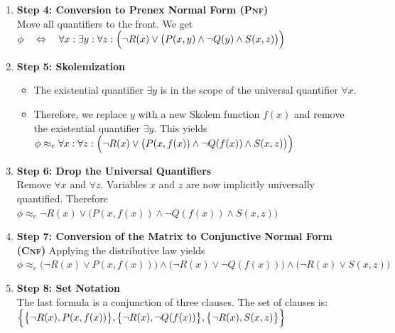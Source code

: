 \begin{enumerate}
\item \textbf{Step 4: Conversion to Prenex Normal Form (\textsc{Pnf})} \\
      Move all quantifiers to the front. We get
      \\[0.2cm]
      \hspace*{1.3cm}
      $\phi \quad\Leftrightarrow\quad
       \forall x: \exists y: \forall z: \Bigl(\neg R(x) \lor \bigl(P(x,y) \land \neg Q(y) \land S(x,z)\bigr)\Bigr)$
    \item \textbf{Step 5: Skolemization}
    \begin{itemize}
        \item The existential quantifier $\exists y$ is in the scope of the universal quantifier $\forall x$.
        \item Therefore, we replace $y$ with a new Skolem function $f(x)$ and remove the existential quantifier
          $\exists y$.   This yields
          \\[0.2cm]
          \hspace*{1.3cm}
          $\phi \approx_e \forall x: \forall z: \Bigl(\neg R(x) \lor \bigl(P(x,f(x)) \land \neg Q(f(x)) \land S(x,z)\bigr)\Bigr)$
       \end{itemize}
  \item \textbf{Step 6: Drop the Universal Quantifiers} \\
    Remove $\forall x$ and $\forall z$. Variables $x$ and $z$ are now implicitly universally quantified.  Therefore
    \\[0.2cm]
    \hspace*{1.3cm}
    $\phi \approx_e \neg R(x) \lor \bigl(P(x,f(x)) \land \neg Q(f(x)) \land S(x,z)\bigr)$ 

    \item \textbf{Step 7: Conversion of the Matrix to Conjunctive Normal Form (\textsc{Cnf})} 
          Applying the distributive law yields 
          \\[0.2cm]
          \hspace*{1.3cm}
    $\phi \approx_e \bigl(\neg R(x) \lor P(x,f(x))\bigr) \land \bigl(\neg R(x) \lor \neg Q(f(x))\bigr) \land \bigl(\neg R(x) \lor S(x,z)\bigr)$

    \item \textbf{Step 8: Set Notation} \\
    The last formula  is a conjunction of three clauses. The set of clauses is: 
    \\[0.2cm]
    \hspace*{1.3cm}
    $\Bigl\{\bigl\{\neg R(x), P(x,f(x))\bigr\}, \bigl\{\neg R(x), \neg Q(f(x))\bigr\}, \bigl\{\neg R(x), S(x,z)\bigl\} \Bigl\}$
\end{enumerate}

